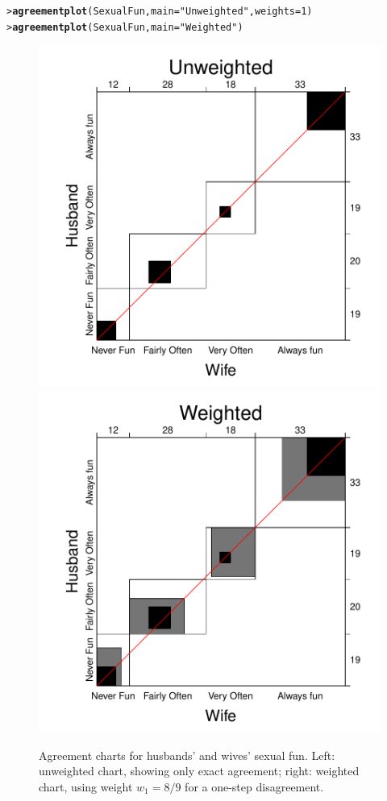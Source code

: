 \documentclass[10pt,krantz2]{krantz}\usepackage[]{graphicx}\usepackage[]{color}
\makeatletter
\newcommand{\hlnum}[1]{\textcolor[rgb]{0.686,0.059,0.569}{#1}}%
\newcommand{\hlstr}[1]{\textcolor[rgb]{0.192,0.494,0.8}{#1}}%
\newcommand{\hlstd}[1]{\textcolor[rgb]{0.345,0.345,0.345}{#1}}%
\newcommand{\hlkwc}[1]{\textcolor[rgb]{0.333,0.667,0.333}{#1}}%
\newcommand{\hlkwd}[1]{\textcolor[rgb]{0.737,0.353,0.396}{\textbf{#1}}}%
\newenvironment{kframe}{%
 \def\at@end@of@kframe{}%
 \ifinner\ifhmode%
  \def\at@end@of@kframe{\end{minipage}}%
  \begin{minipage}{\columnwidth}%
 \fi\fi%
 \def\FrameCommand##1{\hskip\@totalleftmargin \hskip-\fboxsep
 \colorbox{shadecolor}{##1}\hskip-\fboxsep
     \hskip-\linewidth \hskip-\@totalleftmargin \hskip\columnwidth}%
 \MakeFramed {\advance\hsize-\width
   \@totalleftmargin\z@ \linewidth\hsize
   \@setminipage}}%
 {\par\unskip\endMakeFramed%
 \at@end@of@kframe}
\newenvironment{knitrout}{}{} %
\renewenvironment{knitrout}{\small\renewcommand{\baselinestretch}{.85}}{} %
\makeatother
\begin{document}
\begin{knitrout}
\color{fgcolor}\begin{kframe}
\begin{alltt}
\hlstd{> }\hlkwd{agreementplot}\hlstd{(SexualFun,} \hlkwc{main} \hlstd{=} \hlstr{"Unweighted"}\hlstd{,} \hlkwc{weights} \hlstd{=} \hlnum{1}\hlstd{)}
\hlstd{> }\hlkwd{agreementplot}\hlstd{(SexualFun,} \hlkwc{main} \hlstd{=} \hlstr{"Weighted"}\hlstd{)}
\end{alltt}
\end{kframe}\begin{figure}[!htbp]

\centerline{\includegraphics[width=.48\textwidth]{ch04/fig/sexfun-agree-1} 
\includegraphics[width=.48\textwidth]{ch04/fig/sexfun-agree-2} }

\caption[Agreement charts for husbands' and wives' sexual fun]{Agreement charts for husbands' and wives' sexual fun. Left: unweighted chart, showing only exact agreement; right: weighted chart, using weight $w_1 = 8/9$ for a one-step disagreement.\label{fig:sexfun-agree}}
\end{figure}


\end{knitrout}
\end{document}
